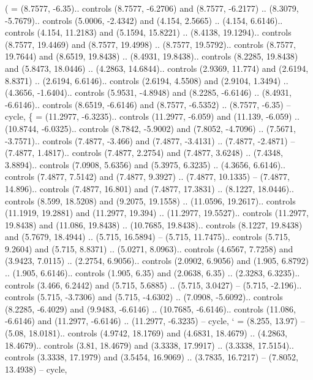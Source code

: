 {(} = {(8.7577, -6.35).. controls (8.7577, -6.2706) and (8.7577, -6.2177) .. (8.3079, -5.7679).. controls (5.0006, -2.4342) and (4.154, 2.5665) .. (4.154, 6.6146).. controls (4.154, 11.2183) and (5.1594, 15.8221) .. (8.4138, 19.1294).. controls (8.7577, 19.4469) and (8.7577, 19.4998) .. (8.7577, 19.5792).. controls (8.7577, 19.7644) and (8.6519, 19.8438) .. (8.4931, 19.8438).. controls (8.2285, 19.8438) and (5.8473, 18.0446) .. (4.2863, 14.6844).. controls (2.9369, 11.774) and (2.6194, 8.8371) .. (2.6194, 6.6146).. controls (2.6194, 4.5508) and (2.9104, 1.3494) .. (4.3656, -1.6404).. controls (5.9531, -4.8948) and (8.2285, -6.6146) .. (8.4931, -6.6146).. controls (8.6519, -6.6146) and (8.7577, -6.5352) .. (8.7577, -6.35) -- cycle},
{\{} = {(11.2977, -6.3235).. controls (11.2977, -6.059) and (11.139, -6.059) .. (10.8744, -6.0325).. controls (8.7842, -5.9002) and (7.8052, -4.7096) .. (7.5671, -3.7571).. controls (7.4877, -3.466) and (7.4877, -3.4131) .. (7.4877, -2.4871) -- (7.4877, 1.4817).. controls (7.4877, 2.2754) and (7.4877, 3.6248) .. (7.4348, 3.8894).. controls (7.0908, 5.6356) and (5.3975, 6.3235) .. (4.3656, 6.6146).. controls (7.4877, 7.5142) and (7.4877, 9.3927) .. (7.4877, 10.1335) -- (7.4877, 14.896).. controls (7.4877, 16.801) and (7.4877, 17.3831) .. (8.1227, 18.0446).. controls (8.599, 18.5208) and (9.2075, 19.1558) .. (11.0596, 19.2617).. controls (11.1919, 19.2881) and (11.2977, 19.394) .. (11.2977, 19.5527).. controls (11.2977, 19.8438) and (11.086, 19.8438) .. (10.7685, 19.8438).. controls (8.1227, 19.8438) and (5.7679, 18.4944) .. (5.715, 16.5894) -- (5.715, 11.7475).. controls (5.715, 9.2604) and (5.715, 8.8371) .. (5.0271, 8.0963).. controls (4.6567, 7.7258) and (3.9423, 7.0115) .. (2.2754, 6.9056).. controls (2.0902, 6.9056) and (1.905, 6.8792) .. (1.905, 6.6146).. controls (1.905, 6.35) and (2.0638, 6.35) .. (2.3283, 6.3235).. controls (3.466, 6.2442) and (5.715, 5.6885) .. (5.715, 3.0427) -- (5.715, -2.196).. controls (5.715, -3.7306) and (5.715, -4.6302) .. (7.0908, -5.6092).. controls (8.2285, -6.4029) and (9.9483, -6.6146) .. (10.7685, -6.6146).. controls (11.086, -6.6146) and (11.2977, -6.6146) .. (11.2977, -6.3235) -- cycle},
{`} = {(8.255, 13.97) -- (5.08, 18.0181).. controls (4.9742, 18.1769) and (4.6831, 18.4679) .. (4.2863, 18.4679).. controls (3.81, 18.4679) and (3.3338, 17.9917) .. (3.3338, 17.5154).. controls (3.3338, 17.1979) and (3.5454, 16.9069) .. (3.7835, 16.7217) -- (7.8052, 13.4938) -- cycle},
